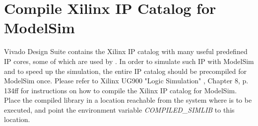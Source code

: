 \section{Compile Xilinx IP Catalog for ModelSim}\label{sec:compile_simlib}%
Vivado Design Suite contains the Xilinx IP catalog with many useful predefined IP cores, some of which are used by \tpc{}.
In order to simulate such IP with ModelSim \cite{modelsim} and to speed up the simulation, the entire IP catalog should be precompiled for ModelSim once.
Please refer to Xilinx UG900 "Logic Simulation" \cite{ug900-2014.3}, Chapter 8, p. 134ff for instructions on how to compile the Xilinx IP catalog for ModelSim.
Place the compiled library in a location reachable from the system where \tpc{} is to be executed, and point the environment variable \emph{COMPILED\_SIMLIB} to this location.

